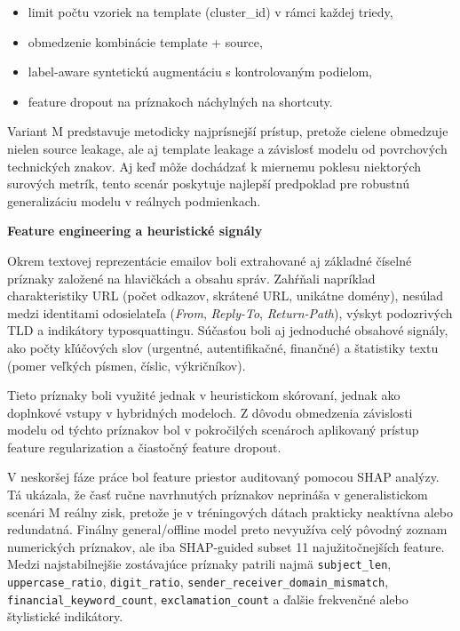 \documentclass[conference]{IEEEtran}
\begin{document}
\begin{itemize}
    \item limit počtu vzoriek na template (cluster\_id) v rámci každej triedy,
    \item obmedzenie kombinácie template + source,
    \item label-aware syntetickú augmentáciu s kontrolovaným podielom,
    \item feature dropout na príznakoch náchylných na shortcuty.
\end{itemize}

Variant M predstavuje metodicky najprísnejší prístup, pretože cielene obmedzuje nielen source leakage, ale aj template leakage a závislosť modelu od povrchových technických znakov. Aj keď môže dochádzať k miernemu poklesu niektorých surových metrík, tento scenár poskytuje najlepší predpoklad pre robustnú generalizáciu modelu v reálnych podmienkach.

\textbf{Feature engineering a heuristické signály}

Okrem textovej reprezentácie emailov boli extrahované aj základné číselné príznaky založené na hlavičkách a obsahu správ. Zahŕňali napríklad charakteristiky URL (počet odkazov, skrátené URL, unikátne domény), nesúlad medzi identitami odosielateľa (\textit{From}, \textit{Reply-To}, \textit{Return-Path}), výskyt podozrivých TLD a indikátory typosquattingu. Súčasťou boli aj jednoduché obsahové signály, ako počty kľúčových slov (urgentné, autentifikačné, finančné) a štatistiky textu (pomer veľkých písmen, číslic, výkričníkov).

Tieto príznaky boli využité jednak v heuristickom skórovaní, jednak ako doplnkové vstupy v hybridných modeloch. Z dôvodu obmedzenia závislosti modelu od týchto príznakov bol v pokročilých scenároch aplikovaný prístup feature regularization a čiastočný feature dropout.

V neskoršej fáze práce bol feature priestor auditovaný pomocou SHAP analýzy. Tá ukázala, že časť ručne navrhnutých príznakov neprináša v generalistickom scenári M reálny zisk, pretože je v tréningových dátach prakticky neaktívna alebo redundatná. Finálny general/offline model preto nevyužíva celý pôvodný zoznam numerických príznakov, ale iba SHAP-guided subset 11 najužitočnejších feature. Medzi najstabilnejšie zostávajúce príznaky patrili najmä \texttt{subject\_len}, \texttt{uppercase\_ratio}, \texttt{digit\_ratio}, \texttt{sender\_receiver\_domain\_mismatch}, \texttt{financial\_keyword\_count}, \texttt{exclamation\_count} a ďalšie frekvenčné alebo štylistické indikátory.
\end{document}
